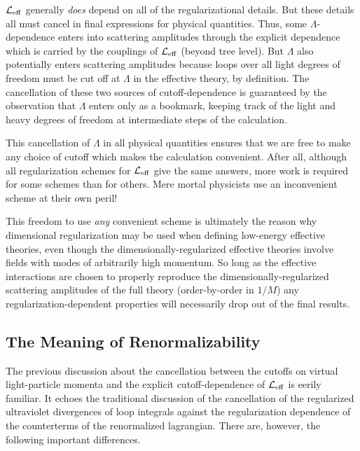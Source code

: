 ${\cal L}_{\rm eff}$ generally {\sl does} 
depend on all of the regularizational details. But these
details all must cancel in final expressions for physical
quantities. Thus, some $\Lambda$-dependence enters into
scattering amplitudes through the explicit dependence which 
is carried by the couplings of ${\cal L}_{\rm eff}$ (beyond
tree level). But $\Lambda$ also potentially enters scattering
amplitudes because loops over all light degrees of freedom
must be cut off at $\Lambda$ in the effective theory, by
definition. The cancellation of these two sources of
cutoff-dependence is guaranteed by the observation that
$\Lambda$ enters only as a bookmark, keeping
track of the light and heavy degrees of freedom at
intermediate steps of the calculation. 

This cancellation of $\Lambda$ in all physical quantities
ensures that we are free to make any choice of cutoff 
which makes the calculation convenient. After all, although
all regularization schemes for ${\cal L}_{\rm eff}$ give
the same answers, more work is required for 
some schemes than for others. Mere mortal physicists
use an inconvenient scheme at their own peril!

This freedom to use {\sl any} convenient
scheme is ultimately the reason why dimensional regularization 
may be used when defining low-energy effective theories,
even though the dimensionally-regularized effective
theories involve fields with modes of arbitrarily high
momentum. So long as the effective interactions are
chosen to properly reproduce the dimensionally-regularized 
scattering amplitudes of the full theory (order-by-order
in $1/M$) any regularization-dependent properties will
necessarily drop out of the final results. 

\subsection{The Meaning of Renormalizability}

The previous discussion about the cancellation between
the cutoffs on virtual light-particle momenta and
the explicit cutoff-dependence of ${\cal L}_{\rm eff}$
is eerily familiar. It echoes the traditional discussion
of the cancellation of the regularized ultraviolet divergences of
loop integrals against the regularization dependence of
the counterterms of the renormalized lagrangian. There
are, however, the following important differences.

